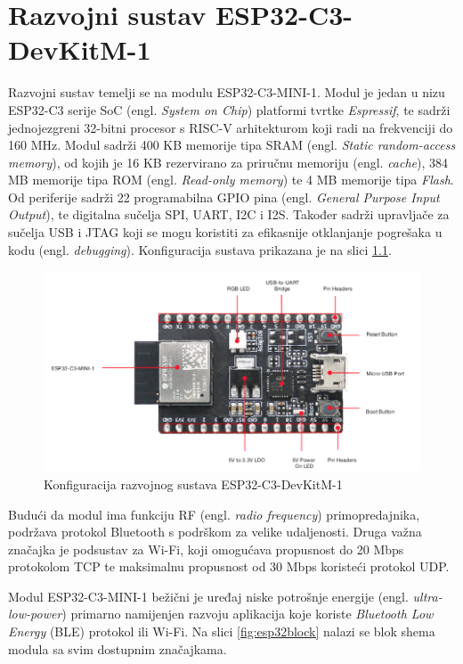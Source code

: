 \chapter{Razvojni sustav ESP32-C3-DevKitM-1}

Razvojni sustav temelji se na modulu ESP32-C3-MINI-1. Modul je jedan u nizu ESP32-­C3 serije SoC (engl. \textit{System on Chip}) platformi tvrtke \textit{Espressif}, te sadrži jednojezgreni 32-bitni procesor s RISC-V arhitekturom koji radi na frekvenciji do 160 MHz. Modul sadrži 400 KB memorije tipa SRAM (engl. \textit{Static random-access memory}), od kojih je 16 KB rezervirano za priručnu memoriju (engl. \textit{cache}), 384 MB memorije tipa ROM (engl. \textit{Read-only memory}) te 4 MB memorije tipa \textit{Flash}. Od periferije sadrži 22 programabilna GPIO pina (engl. \textit{General Purpose Input Output}), te digitalna sučelja SPI, UART, I2C i I2S. Također sadrži upravljače za sučelja USB i JTAG koji se mogu koristiti za efikasnije otklanjanje pogrešaka u kodu (engl. \textit{debugging}). \cite{esp32manual} Konfiguracija sustava prikazana je na slici \ref{fig:esp32}.

\begin{figure}[ht]
	\centering
	\includegraphics[scale=0.6]{imgs/esp32}
	\caption{Konfiguracija razvojnog sustava ESP32-C3-DevKitM-1 \cite{espressif}}
	\label{fig:esp32}
\end{figure}

Budući da modul ima funkciju RF (engl. \textit{radio frequency}) primopredajnika, podržava protokol Bluetooth s podrškom za velike udaljenosti. Druga važna značajka je podsustav za Wi-Fi, koji omogućava propusnost do 20 Mbps protokolom TCP te maksimalnu propusnost od 30 Mbps koristeći protokol UDP. 

Modul ESP32-C3-MINI-1 bežični je uređaj niske potrošnje energije (engl. \textit{ultra-low-power}) primarno namijenjen razvoju aplikacija koje koriste \textit{Bluetooth Low Energy} (BLE) protokol ili Wi-Fi. Na slici \ref{fig:esp32block} nalazi se blok shema modula sa svim dostupnim značajkama.

